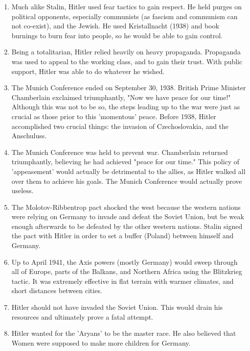 \documentclass[12pt]{article}
\begin{document}
\begin{flushleft}
\begin{enumerate}
\item Much alike Stalin, Hitler used fear tactics to gain respect. He held purges on political opponents, especially communists (as fascism and communism can not co-exist), and the Jewish. He used Kristallnacht (1938) and book burnings to burn fear into people, so he would be able to gain control.

\item Being a totalitarian, Hitler relied heavily on heavy propaganda. Propaganda was used to appeal to the working class, and to gain their trust. With public support, Hitler was able to 
do whatever he wished.

\item The Munich Conference ended on September 30, 1938. British Prime Minister Chamberlain exclaimed triumphantly, "Now we have peace for our time!" Although this was not to be so, the steps leading up to the war were just as crucial as those prior to this 'momentous' peace. Before 1938, Hitler accomplished two crucial things: the invasion of Czechoslovakia, and the Anschuluss.

\item The Munich Conference was held to prevent war. Chamberlain returned triumphantly, believing he had achieved "peace for our time." This policy of 'appeasement' would actually be detrimental to the allies, as Hitler walked all over them to achieve his goals. The Munich Conference would actually prove useless.

\item The Molotov-Ribbentrop pact shocked the west because the western nations were relying on Germany to invade and defeat the Soviet Union, but be weak enough afterwards to be defeated by the other western nations. Stalin signed the pact with Hitler in order to set a buffer (Poland) between himself and Germany.

\item Up to April 1941, the Axis powers (mostly Germany) would sweep through all of Europe, parts of the Balkans, and Northern Africa using the Blitzkrieg tactic. It was extremely effective in flat terrain with warmer climates, and short distances between cities. 

\item Hitler should not have invaded the Soviet Union. This would drain his resources and ultimately prove a fatal attempt. 

\item Hitler wanted for the 'Aryans' to be the master race. He also believed that Women were supposed to make more children for Germany.


\end{enumerate}
\end{flushleft}
\end{document}

